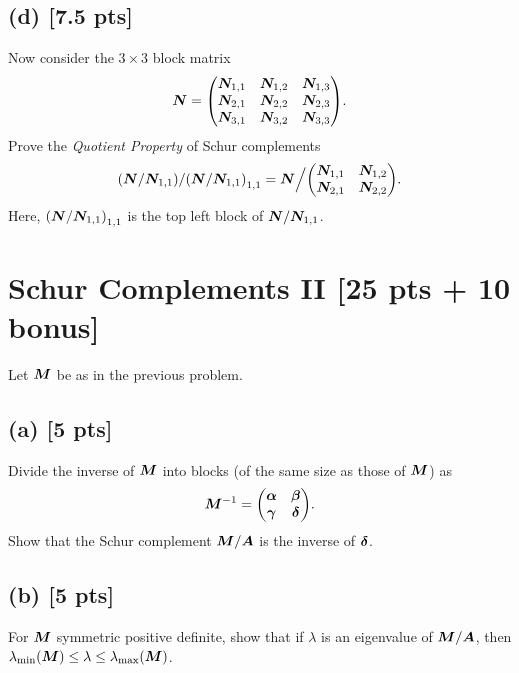 \documentclass[twoside,10pt]{article}
\begin{document}
\subsection*{(d) [7.5 pts]}
Now consider the $3 \times 3$ block matrix 
\begin{equation}
  \mtx{N} = 
  \begin{pmatrix}
    \mtx{N}_{1, 1} & \mtx{N}_{1, 2} & \mtx{N}_{1, 3} \\
    \mtx{N}_{2, 1} & \mtx{N}_{2, 2} & \mtx{N}_{2, 3} \\
    \mtx{N}_{3, 1} & \mtx{N}_{3, 2} & \mtx{N}_{3, 3}
  \end{pmatrix}.
\end{equation}
Prove the \emph{Quotient Property} of Schur complements
\begin{equation}
  \left(\mtx{N} / \mtx{N}_{1, 1}\right) / \left(\mtx{N} / \mtx{N}_{1, 1}\right)_{1, 1} 
  = 
  \mtx{N} \Big / 
  \begin{pmatrix}
    \mtx{N}_{1, 1} & \mtx{N}_{1, 2} \\
    \mtx{N}_{2, 1} & \mtx{N}_{2, 2} 
  \end{pmatrix}.
\end{equation}
Here, $\left(\mtx{N} / \mtx{N}_{1, 1}\right)_{1, 1}$ is the top left block of $\bm{N} / \bm{N}_{1, 1}$. 



\section{Schur Complements II [25 pts + 10 bonus]}
Let $\bm{M}$ be as in the previous problem. 

\subsection*{(a) [5 pts]}
Divide the inverse of $\bm{M}$ into blocks (of the same size as those of $\bm{M}$) as
\begin{equation}
  \mtx{M}^{-1} = 
  \begin{pmatrix}
    \mtx{\alpha} & \mtx{\beta} \\
    \mtx{\gamma} & \mtx{\delta}
  \end{pmatrix}.
\end{equation}
Show that the Schur complement $\bm{M} / \bm{A}$ is the inverse of $\bm{\delta}$.

\subsection*{(b) [5 pts]} 
For $\bm{M}$ symmetric positive definite, show that if $\lambda$ is an eigenvalue of $\bm{M} / \bm{A}$, then $\lambda_{\min}\left(\mtx{M} \right) \leq \lambda \leq \lambda_{\max}\left(\mtx{M}\right)$.
\end{document}
